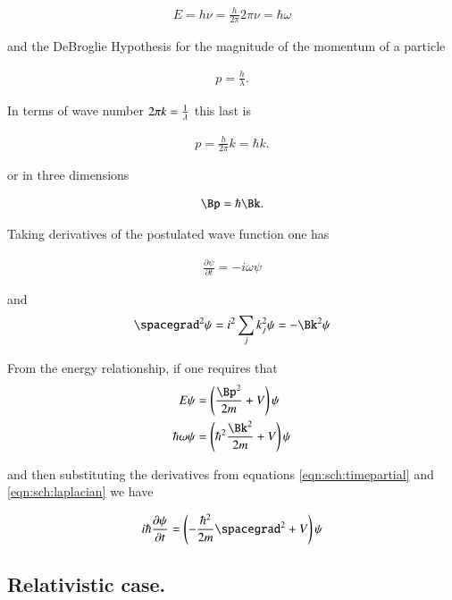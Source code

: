 \begin{align}
E = h \nu = \frac{h}{2\pi} 2 \pi \nu = \hbar \omega
\end{align}

and the DeBroglie Hypothesis for the magnitude of the momentum of a particle

\begin{align*}
p = \frac{h}{\lambda}.
\end{align*}

In terms of wave number $2 \pi k = \frac{1}{\lambda}$ this last is

\begin{align*}
p = \frac{h}{2\pi} k = \hbar k.
\end{align*}

or in three dimensions

\begin{align*}
\Bp = \hbar \Bk.
\end{align*}

Taking derivatives of the postulated wave function one has

\begin{align}\label{eqn:sch:timepartial}
\frac{\partial \psi}{\partial t} = -i \omega \psi
\end{align}

and 
\begin{align}\label{eqn:sch:laplacian}
\spacegrad^2 \psi = i^2 \sum_j k_j^2 \psi = - \Bk^2 \psi
\end{align}

From the energy relationship, if one requires that
\begin{align}
E \psi &= \left(\frac{\Bp^2}{2m} + V\right) \psi \\
\hbar \omega \psi &= \left(\hbar^2 \frac{\Bk^2}{2m} + V\right) \psi \\
\end{align}

and then substituting the derivatives from equations \ref{eqn:sch:timepartial} and \ref{eqn:sch:laplacian} we have

\begin{align*}
i \hbar \PD{t}{\psi} &= \left(-\frac{\hbar^2}{2m} \spacegrad^2  + V\right) \psi \\
\end{align*}

\subsection{Relativistic case. }


